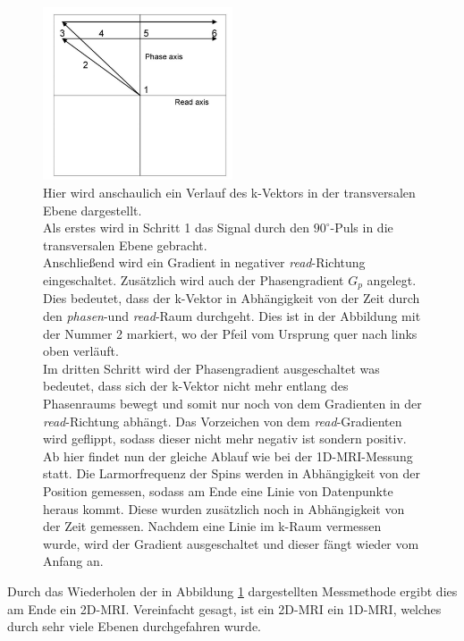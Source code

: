 \begin{figure}[H]
    \centering
    \includegraphics[width = 0.5\textwidth]{Abbildungen/2DMRI.JPG}
    \caption[Veranschaulichter Verlauf des k-Vektors im 2D-MRI]{Hier wird anschaulich ein Verlauf des k-Vektors in der transversalen Ebene dargestellt.\\
    Als erstes wird in Schritt 1 das Signal durch den $90^{\circ}$-Puls in die transversalen Ebene gebracht.\\
    Anschließend wird ein Gradient in negativer \textit{read}-Richtung eingeschaltet. Zusätzlich wird auch der Phasengradient $G_p$ angelegt. Dies bedeutet, dass der k-Vektor in Abhängigkeit von der Zeit durch den \textit{phasen}-und \textit{read}-Raum durchgeht. Dies ist in der Abbildung mit der Nummer 2 markiert, wo der Pfeil vom Ursprung quer nach links oben verläuft.\\
    Im dritten Schritt wird der Phasengradient ausgeschaltet was bedeutet, dass sich der k-Vektor nicht mehr entlang des Phasenraums bewegt und somit nur noch von dem Gradienten in der \textit{read}-Richtung abhängt. Das Vorzeichen von dem \textit{read}-Gradienten wird geflippt, sodass dieser nicht mehr negativ ist sondern positiv. Ab hier findet nun der gleiche Ablauf wie bei der 1D-MRI-Messung statt. Die Larmorfrequenz der Spins werden in Abhängigkeit von der Position gemessen, sodass am Ende eine Linie von Datenpunkte heraus kommt. Diese wurden  zusätzlich noch in Abhängigkeit von der Zeit gemessen. Nachdem eine Linie im k-Raum vermessen wurde, wird der Gradient ausgeschaltet und dieser fängt wieder vom Anfang an. \cite{Schmidt}}
    \label{fig:2DMRIk}
\end{figure}
Durch das Wiederholen der in Abbildung \ref{fig:2DMRIk} dargestellten Messmethode ergibt dies am Ende ein 2D-MRI. Vereinfacht gesagt, ist ein 2D-MRI ein 1D-MRI, welches durch sehr viele Ebenen durchgefahren wurde.

